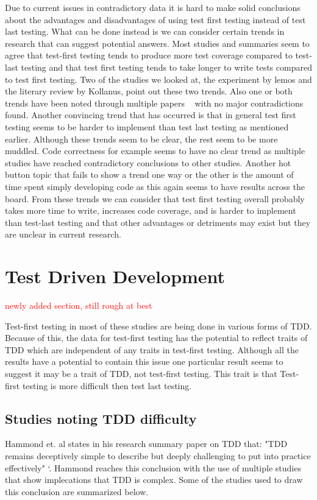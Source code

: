 \documentclass{sig-alternate}
\newcommand{\mycomment}[1]{\textcolor{red}{#1}}
\begin{document}
Due to current issues in contradictory data it is hard to make solid conclusions about the advantages and disadvantages of using test first testing instead of test last testing.  What can be done instead is we can consider certain trends in research that can suggest potential answers.  Most studies and summaries seem to agree that test-first testing tends to produce more test coverage compared to test-last testing and that test first testing tends to take longer to write tests compared to test first testing.  Two of the studies we looked at, the experiment by lemos and the literary review by Kollanus, point out these two trends.  Also one or both trends have been noted through multiple papers ~\cite{Kettunen:2010, Hammond:2012, Hellman:2012} with no major contradictions found.  Another convincing trend that has occurred is that in general test first testing seems to be harder to implement than test last testing as mentioned earlier.   Although these trends seem to be clear, the rest seem to be more muddled.  Code correctness for example seems to have no clear trend as multiple studies have reached contradictory conclusions to other studies.  Another hot button topic that fails to show a trend one way or the other is the amount of time spent simply developing code as this again seems to have results across the board.  From these trends we can consider that test first testing overall probably takes more time to write, increases code coverage, and is harder to implement than test-last testing and that other advantages or detriments may exist but they are unclear in current research.

\section{Test Driven Development}
\mycomment{newly added section, still rough at best}

Test-first testing in most of these studies are being done in various forms of TDD.  Because of this, the data for test-first testing has the potential to reflect traits of TDD which are independent of any traits in test-first testing.  Although all the results have a potential to contain this issue one particular result seems to suggest it may be a trait of TDD, not test-first testing.  This trait is that Test-first testing is more difficult then test last testing.  

\subsection{Studies noting TDD difficulty}
Hammond et. al states in his research summary paper on TDD that: "TDD remains deceptively simple to describe but deeply challenging to put into practice effectively" `\cite{Hammond:2012}.  Hammond reaches this conclusion with the use of multiple studies that show implecations that TDD is complex.  Some of the studies used to draw this conclusion are summarized below.
\end{document}
